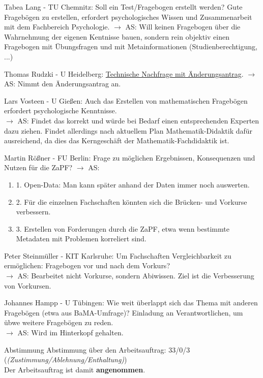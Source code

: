     \begin{outline}
      \1 Tabea Lang - TU Chemnitz:  Soll ein Test/Fragebogen erstellt werden? Gute Fragebögen zu erstellen, erfordert psychologisches Wissen und Zusammenarbeit mit dem Fachbereich Psychologie. $\rightarrow$ AS: Will keinen Fragebogen über die Wahrnehmung der eigenen Kentnisse bauen, sondern rein objektiv einen Fragebogen mit Übungsfragen und mit Metainformationen (Studienberechtigung, ...)

      \1 Thomas Rudzki - U Heidelberg:  \underline{Technische Nachfrage mit Änderungsantrag}.
        $\rightarrow$ AS: Nimmt den Änderungsantrag an.

      \1 Lars Vosteen - U Gießen:  Auch das Erstellen von mathematischen Fragebögen erfordert psychologische Kenntnisse. \\
        $\rightarrow$ AS: Findet das korrekt und würde bei Bedarf einen entsprechenden Experten dazu ziehen. Findet allerdings nach aktuellem Plan Mathematik-Didaktik dafür ausreichend, da dies das Kerngeschäft der Mathematik-Fachdidaktik ist.

      \1 Martin Rößner - FU Berlin:  Frage zu möglichen Ergebnissen, Konsequenzen und Nutzen für die ZaPF? $\rightarrow$ AS:
        \begin{enumerate}
          \item 1. Open-Data: Man kann später anhand der Daten immer noch auswerten.
          \item 2. Für die einzelnen Fachschaften könnten sich die Brücken- und Vorkurse verbessern.
          \item 3. Erstellen von Forderungen durch die ZaPF, etwa wenn bestimmte Metadaten mit Problemen korreliert sind.
        \end{enumerate}

      \1 Peter Steinmüller - KIT Karlsruhe:  Um Fachschaften Vergleichbarkeit zu ermöglichen: Fragebogen vor und nach dem Vorkurs? \\
        $\rightarrow$ AS: Bearbeitet nicht Vorkurse, sondern Abiwissen. Ziel ist die Verbesserung von Vorkursen.

      \1 Johannes Hampp - U Tübingen:  Wie weit überlappt sich das Thema mit anderen Fragebögen (etwa aus BaMA-Umfrage)? Einladung an Verantwortlichen, um übwe weitere Fragebögen zu reden. \\
        $\rightarrow$ AS: Wird im Hinterkopf gehalten.
    \end{outline}

    \begin{success}{Abstimmung}
      Abstimmung über den Arbeitsauftrag: 33/0/3 (\textit{(Zustimmung/Ablehnung/Enthaltung)}) \\
      Der Arbeitsauftrag ist damit \textbf{angenommen}.
    \end{success}


